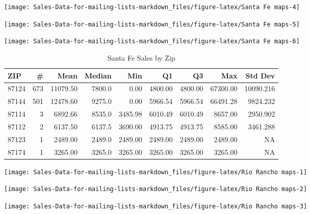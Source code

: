 \documentclass[
]{article}
\begin{document}
\begin{center}\texttt{[image: Sales-Data-for-mailing-lists-markdown\_files/figure-latex/Santa Fe maps-4]} \end{center}

\begin{center}\texttt{[image: Sales-Data-for-mailing-lists-markdown\_files/figure-latex/Santa Fe maps-5]} \end{center}

\begin{center}\texttt{[image: Sales-Data-for-mailing-lists-markdown\_files/figure-latex/Santa Fe maps-6]} \end{center}

\begin{table}

\caption{\label{tab:Rio Rancho maps}Santa Fe Sales by Zip}
\centering
\begin{tabular}[t]{l|r|r|r|r|r|r|r|r}
\hline
ZIP & \# & Mean & Median & Min & Q1 & Q3 & Max & Std Dev\\
\hline
87124 & 673 & 11079.50 & 7800.0 & 0.00 & 4800.00 & 4800.00 & 67300.00 & 10090.216\\
\hline
87144 & 501 & 12478.60 & 9275.0 & 0.00 & 5966.54 & 5966.54 & 66491.28 & 9824.232\\
\hline
87114 & 3 & 6892.66 & 8535.0 & 3485.98 & 6010.49 & 6010.49 & 8657.00 & 2950.902\\
\hline
87112 & 2 & 6137.50 & 6137.5 & 3690.00 & 4913.75 & 4913.75 & 8585.00 & 3461.288\\
\hline
87123 & 1 & 2489.00 & 2489.0 & 2489.00 & 2489.00 & 2489.00 & 2489.00 & NA\\
\hline
87174 & 1 & 3265.00 & 3265.0 & 3265.00 & 3265.00 & 3265.00 & 3265.00 & NA\\
\hline
\end{tabular}
\end{table}

\begin{center}\texttt{[image: Sales-Data-for-mailing-lists-markdown\_files/figure-latex/Rio Rancho maps-1]} \end{center}

\begin{center}\texttt{[image: Sales-Data-for-mailing-lists-markdown\_files/figure-latex/Rio Rancho maps-2]} \end{center}

\begin{center}\texttt{[image: Sales-Data-for-mailing-lists-markdown\_files/figure-latex/Rio Rancho maps-3]} \end{center}
\end{document}
